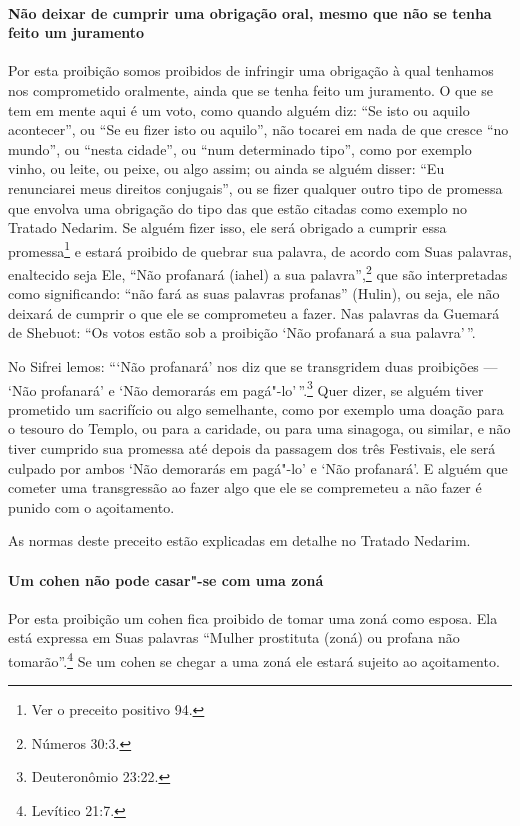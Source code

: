 \begin{multicols}{2}
\paragraph{Não deixar de cumprir uma obrigação oral, mesmo que não se tenha
feito um juramento}

Por esta proibição somos proibidos de infringir uma obrigação à qual
tenhamos nos comprometido oralmente, ainda que se tenha feito um
juramento. O que se tem em mente aqui é um voto, como quando alguém
diz: ``Se isto ou aquilo acontecer'', ou ``Se eu fizer isto ou aquilo'',
não tocarei em nada de que cresce ``no mundo'', ou ``nesta cidade'', ou
``num determinado tipo'', como por exemplo vinho, ou leite, ou peixe, ou algo assim; ou ainda se alguém
disser: ``Eu renunciarei meus direitos conjugais'', ou se fizer
qualquer outro tipo de promessa que envolva uma obrigação do tipo das
que estão citadas como exemplo no Tratado Nedarim\starr. Se alguém fizer isso,
ele será obrigado a cumprir essa promessa\footnote{Ver o preceito positivo 94.} e estará
proibido de quebrar sua palavra, de acordo com Suas palavras, enaltecido
seja Ele, ``Não profanará (iahel\starr) a sua palavra'',\footnote{Números 30:3.} que
são interpretadas como significando: ``não fará as suas palavras
profanas'' (Hulin\starr), ou seja, ele não deixará de cumprir o que ele se
comprometeu a fazer. Nas palavras da Guemará\starr{} de Shebuot\starr: ``Os votos
estão sob a proibição `Não profanará a sua palavra'\,''.

No Sifrei\starr{} lemos: ```Não profanará' nos diz que se transgridem duas
proibições --- `Não profanará' e `Não demorarás em pagá"-lo'\,''.\footnote{Deuteronômio 23:22.} Quer dizer, se alguém tiver prometido um
sacrifício ou algo semelhante, como por exemplo uma doação para o
tesouro do Templo, ou para a caridade, ou para uma sinagoga, ou similar,
e não tiver cumprido sua promessa até depois da passagem dos três
Festivais, ele será culpado por ambos `Não demorarás em pagá"-lo' e `Não
profanará'. E alguém que cometer uma transgressão ao fazer algo que ele
se compremeteu a não fazer é punido com o açoitamento.

As normas deste preceito estão explicadas em detalhe no Tratado Nedarim\starr.

\paragraph{Um cohen\starr{} não pode casar"-se com uma zoná\starr{}}

Por esta proibição um cohen\starr{} fica proibido de tomar uma zoná\starr{} como
esposa. Ela está expressa em Suas palavras ``Mulher prostituta (zoná\starr) ou
profana não tomarão''.\footnote{Levítico 21:7.} Se um cohen\starr{} se chegar a uma
zoná\starr{} ele estará sujeito ao açoitamento.


\end{multicols}
